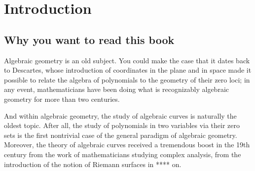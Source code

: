 

\setlength{\parskip}{5pt}

\addtocounter{chapter}{-1}
\chapter{Introduction}
\label{IntroChapter}

%
%
%

%


\section{Why you want to read this book}

Algebraic geometry is an old subject. You could make the case that it dates back to Descartes, whose introduction of coordinates in the plane and in space made it possible to relate the algebra of polynomials to the geometry of their zero loci; in any event, mathematicians have been doing what is recognizably algebraic geometry for more than two centuries.

And within algebraic geometry, the study of algebraic curves is naturally the oldest topic. After all, the study of polynomials in two variables via their zero sets is the first nontrivial case of the general paradigm of algebraic geometry. Moreover, the theory of algebraic curves received a tremendous boost in the 19th century from the work of mathematicians studying complex analysis, from the introduction of the notion of Riemann surfaces in **** on.

